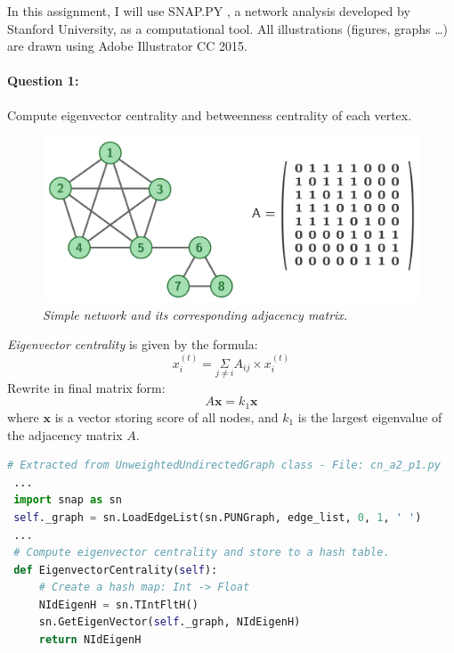 \documentclass[a4paper,12pt]{article}
\begin{document}
\noindent
In this assignment, I will use SNAP.PY \cite{snap}, a network analysis developed by Stanford University, as a computational tool. All illustrations (figures, graphs \ldots) are drawn using Adobe Illustrator CC 2015.

\paragraph{Question 1:} Compute eigenvector centrality and betweenness centrality of each vertex.

\begin{figure}[h]
    \includegraphics[width=\textwidth]{cn_a2_net}
    \caption{\emph{Simple network and its corresponding adjacency matrix.}}
    \label{fig:net}
\end{figure}

\noindent
\emph{Eigenvector centrality} is given by the formula:
$$ x_i^{(t)}= \underset{j \neq i}{\Sigma} A_{ij} \times x_i^{(t)} $$
Rewrite in final matrix form:
$$ A\boldsymbol{x} = k_1\boldsymbol{x} $$
where $\boldsymbol{x}$ is a vector storing score of all nodes, and $k_1$ is the largest eigenvalue of the adjacency matrix $A$.

\begin{lstlisting}[language=Python, caption={Eigenvector centrality computation with SNAP.PY}, label={lst:eig}]
 # Extracted from UnweightedUndirectedGraph class - File: cn_a2_p1.py
 ...
 import snap as sn
 self._graph = sn.LoadEdgeList(sn.PUNGraph, edge_list, 0, 1, ' ')
 ...
 # Compute eigenvector centrality and store to a hash table.
 def EigenvectorCentrality(self):
     # Create a hash map: Int -> Float
     NIdEigenH = sn.TIntFltH()
     sn.GetEigenVector(self._graph, NIdEigenH)
     return NIdEigenH
\end{lstlisting}

\pagebreak
\end{document}
